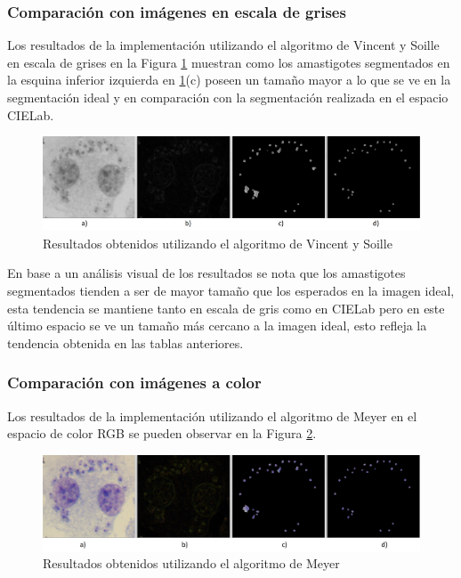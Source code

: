 \subsubsection{Comparación con imágenes en escala de grises}

Los resultados de la implementación utilizando el algoritmo de Vincent y Soille en escala de grises en la Figura \ref{exp:gris} muestran como los amastigotes segmentados en la esquina inferior izquierda en \ref{exp:gris}(c) poseen un tamaño mayor a lo que se ve en la segmentación ideal y en comparación con la segmentación realizada en el espacio CIELab.
\begin{figure}[h]
\centering
\includegraphics[width=150mm]{./imagenes/ejemplo-gris.png}
\caption{Resultados obtenidos utilizando el algoritmo de Vincent y Soille}
\label{exp:gris}
\end{figure}

En base a un análisis visual de los resultados se nota que los amastigotes segmentados tienden a ser de mayor tamaño que los esperados en la imagen ideal, esta tendencia se mantiene tanto en escala de gris como en CIELab pero en este último espacio se ve un tamaño más cercano a la imagen ideal, esto refleja la tendencia obtenida en las tablas anteriores.

\subsubsection{Comparación con imágenes a color}

Los resultados de la implementación utilizando el algoritmo de Meyer en el espacio de color RGB se pueden observar en la Figura \ref{exp:rgb}. 
\begin{figure}[h]
\centering
\includegraphics[width=150mm]{./imagenes/ejemplo-rgb.png}
\caption{Resultados obtenidos utilizando el algoritmo de Meyer}
\label{exp:rgb}
\end{figure}

